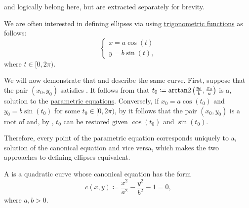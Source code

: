 \begin{definition}
\begin{thmenum}
     and  logically belong here, but are extracted separately for brevity.

    We are often interested in defining ellipses via  using \hyperref[def:trigonometric_functions]{trigonometric functions} as follows:
    \begin{equation}\label{def:quadratic_plane_curve/ellipse/parametric_equations}
      \begin{cases}
        x = a \cos(t) \\
        y = b \sin(t),
      \end{cases}
    \end{equation}
    where \( t \in [0, 2\pi) \).

    We will now demonstrate that  and  describe the same curve. First, suppose that the pair \( (x_0, y_0) \) satisfies . It follows from  that \( t_0 \coloneqq \operatorname{arctan2}\left(\tfrac {y_0} b, \tfrac {x_0} a \right) \) is a, solution to the \hyperref[def:quadratic_plane_curve/ellipse/parametric_equations]{parametric equations}. Conversely, if \( x_0 = a \cos(t_0) \) and \( y_0 = b \sin(t_0) \) for some \( t_0 \in [0, 2\pi) \), by  it follows that the pair \( (x_0, y_0) \) is a root of  and, by , \( t_0 \) can be restored given \( \cos(t_0) \) and \( \sin(t_0) \).

    Therefore, every point of the parametric equation  corresponds uniquely to a, solution of the canonical equation  and vice versa, which makes the two approaches to defining ellipses equivalent.

     A  is a quadratic curve whose canonical equation has the form
    \begin{equation}\label{def:quadratic_plane_curve/hyperbola/canonical_equation}
      c(x, y) \coloneqq \frac {x^2} {a^2} - \frac {y^2} {b^2} - 1 = 0,
    \end{equation}
    where \( a, b > 0 \).


\end{thmenum}
\end{definition}
